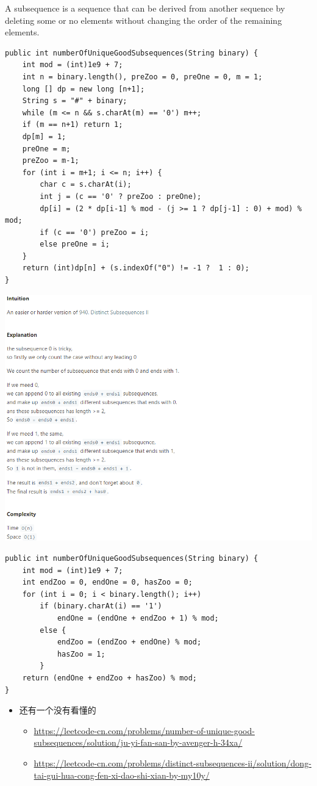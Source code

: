 \documentclass[9pt, b5paaper]{book}
\begin{document}
A subsequence is a sequence that can be derived from another sequence by deleting some or no elements without changing the order of the remaining elements.
\begin{verbatim}
public int numberOfUniqueGoodSubsequences(String binary) {
    int mod = (int)1e9 + 7;
    int n = binary.length(), preZoo = 0, preOne = 0, m = 1;
    long [] dp = new long [n+1];
    String s = "#" + binary;
    while (m <= n && s.charAt(m) == '0') m++;
    if (m == n+1) return 1;
    dp[m] = 1;
    preOne = m;
    preZoo = m-1;
    for (int i = m+1; i <= n; i++) {
        char c = s.charAt(i);
        int j = (c == '0' ? preZoo : preOne);
        dp[i] = (2 * dp[i-1] % mod - (j >= 1 ? dp[j-1] : 0) + mod) % mod;
        if (c == '0') preZoo = i;
        else preOne = i;
    }
    return (int)dp[n] + (s.indexOf("0") != -1 ?  1 : 0);
}
\end{verbatim}
\includegraphics[width=.9\linewidth]{./pic/distinctSubsequence.png}
\begin{verbatim}
public int numberOfUniqueGoodSubsequences(String binary) {
    int mod = (int)1e9 + 7;
    int endZoo = 0, endOne = 0, hasZoo = 0;
    for (int i = 0; i < binary.length(); i++) 
        if (binary.charAt(i) == '1')
            endOne = (endOne + endZoo + 1) % mod;
        else {
            endZoo = (endZoo + endOne) % mod;
            hasZoo = 1;
        }
    return (endOne + endZoo + hasZoo) % mod;
}
\end{verbatim}
\begin{itemize}
\item 还有一个没有看懂的
\begin{itemize}
\item \url{https://leetcode-cn.com/problems/number-of-unique-good-subsequences/solution/ju-yi-fan-san-by-avenger-h-34xa/}
\item \url{https://leetcode-cn.com/problems/distinct-subsequences-ii/solution/dong-tai-gui-hua-cong-fen-xi-dao-shi-xian-by-my10y/}
\end{itemize}
\end{itemize}
\end{document}
